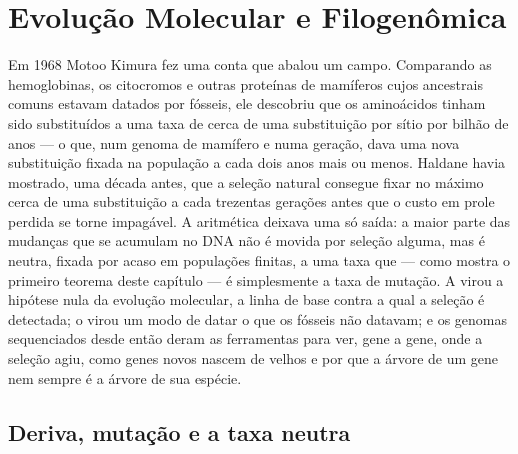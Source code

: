 \chapter{Evolução Molecular e Filogenômica}\label{ch:b3:molecular-evolution}

Em 1968 Motoo Kimura fez uma conta que abalou um campo. Comparando as
hemoglobinas, os citocromos e outras proteínas de mamíferos cujos
ancestrais comuns estavam datados por fósseis, ele descobriu que os
aminoácidos tinham sido substituídos a uma taxa de cerca de uma
substituição por sítio por bilhão de anos --- o que, num genoma de
mamífero e numa geração, dava uma nova substituição fixada na população a
cada dois anos mais ou menos. Haldane havia mostrado, uma década antes,
que a seleção natural consegue fixar no máximo cerca de uma substituição
a cada trezentas gerações antes que o custo em prole perdida se torne
impagável. A aritmética deixava uma só saída: a maior parte das mudanças
que se acumulam no DNA não é movida por seleção alguma, mas é neutra,
fixada por acaso em populações finitas, a uma taxa que --- como mostra o
primeiro teorema deste capítulo --- é simplesmente a taxa de mutação. A
 virou a hipótese nula da evolução molecular, a linha de
base contra a qual a seleção é detectada; o  virou um
modo de datar o que os fósseis não datavam; e os genomas sequenciados
desde então deram as ferramentas para ver, gene a gene, onde a seleção
agiu, como genes novos nascem de velhos e por que a árvore de um gene
nem sempre é a árvore de sua espécie.

\section{Deriva, mutação e a taxa neutra}

